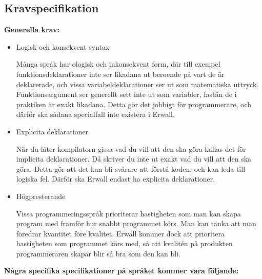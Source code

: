 \documentclass{theme}
\begin{document}
\subsection{Kravspecifikation}

\textbf{Generella krav:}

\begin{itemize}
	\item Logisk och konsekvent syntax

		Många språk har ologisk och inkonsekvent form, där till exempel
		funktionsdeklarationer inte ser likadana ut beroende på vart de
		är deklarerade, och vissa variabeldeklarationer ser ut som matematiska
		uttryck. Funktionsargument ser generellt sett inte ut som variabler,
		fastän de i praktiken är exakt likadana. Detta gör det jobbigt för
		programmerare, och därför ska sådana specialfall inte existera i Erwall.

	\item Explicita deklarationer

		När du låter kompilatorn gissa vad du vill att den ska göra kallas det
		för implicita deklarationer. Då skriver du inte ut exakt vad du vill att
		den ska göra. Detta gör att det kan bli svårare att förstå koden, och
		kan leda till logiska fel. Därför ska Erwall endast ha explicita
		deklarationer.

	\item Högpresterande

		Vissa programmeringsspråk prioriterar hastigheten som man kan skapa
		program med framför hur snabbt programmet körs. Man kan tänka att man
		föredrar kvantitet före kvalitet. Erwall kommer dock att prioritera
		hastigheten som programmet körs med, så att kvalitén på produkten
		programmeraren skapar blir så bra som den kan bli.\\

\end{itemize}

\noindent \textbf{Några specifika specifikationer på språket kommer vara
följande:}
\end{document}
